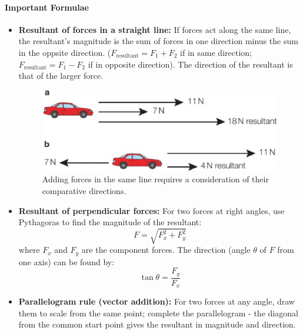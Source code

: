 \paragraph{Important Formulae}
\begin{itemize}
    \item \textbf{Resultant of forces in a straight line:} If forces act along the same line, the resultant's magnitude is the
    sum of forces in one direction minus the sum in the oppsite direction. ($F_{\text{resultant}} = F_1 + F_2$ if in same
    direction; $F_{\text{resultant}} = F_1 - F_2$ if in opposite direction). The direction of the resultant is that of the larger
    force.
    \begin{figure}[H]
        \centering
        \includegraphics[scale=0.15]{Physics/1A/Images/1A-3-1.png}
        \caption{Adding forces in the same line requires a consideration of their comparative directions.}
    \end{figure}
    \item \textbf{Resultant of perpendicular forces:} For two forces at right angles, use Pythagoras to find the magnitude of
    the resultant:
    \begin{equation}
        F = \sqrt{F_x^2 + F_y^2}
    \end{equation}
    where $F_x$ and $F_y$ are the component forces. The direction (angle $\theta$ of $F$ from one axis) can be found by:
    \begin{equation}
        \tan \theta = \frac{F_y}{F_x}
    \end{equation}
    \begin{center}
    \end{center}
    \item \textbf{Parallelogram rule (vector addition):} For two forces at any angle, draw them to scale from the same point;
    complete the parallelogram - the diagonal from the common start point gives the resultant in magnitude and direction.
\end{itemize}

